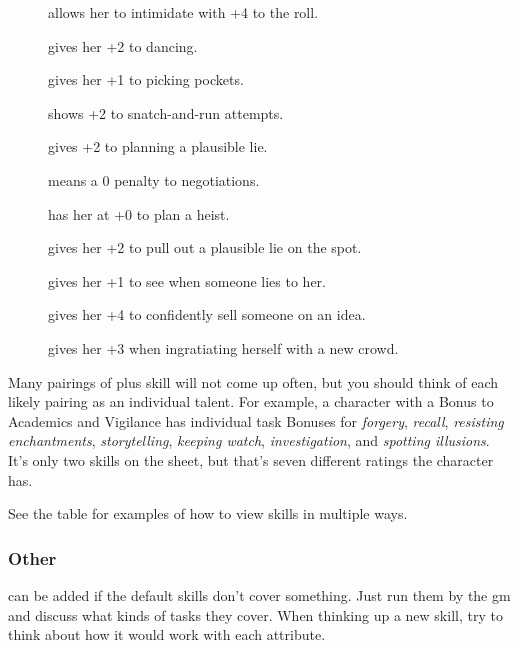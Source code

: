 \begin{multicols}{2}
\begin{description}
  \item[]
    allows her to intimidate with +4 to the roll.
  \item[]
    gives her +2 to dancing.
  \item[]
    gives her +1 to picking pockets.
  \item[]
    shows +2 to snatch-and-run attempts.
  \item[]
    gives +2 to planning a plausible lie.
  \item[]
    means a 0 penalty to negotiations.
  \item[]
    has her at +0 to plan a heist.
  \item[]
    gives her +2 to pull out a plausible lie on the spot.
  \item[]
    gives her +1 to see when someone lies to her.
  \item[]
    gives her +4 to confidently sell someone on an idea.
  \item[]
    gives her +3 when ingratiating herself with a new crowd.
\end{description}

Many pairings of  plus \gls{skill} will not come up often, but you should think of each likely pairing as an individual talent.
For example, a character with a Bonus to Academics and Vigilance has individual task Bonuses for \textit{forgery}, \textit{recall}, \textit{resisting enchantments}, \textit{storytelling}, \textit{keeping watch}, \textit{investigation}, and \textit{spotting illusions}.
It's only two \glspl{skill} on the sheet, but that's seven different ratings the character has.

See the table  for examples of how to view \glspl{skill} in multiple ways.

\bigSkillsTable

\subsubsection{Other }
can be added if the default \glspl{skill} don't cover something.
Just run them by the \gls{gm} and discuss what kinds of tasks they cover.
When thinking up a new \gls{skill}, try to think about how it would work with each \gls{attribute}.


\end{multicols}

